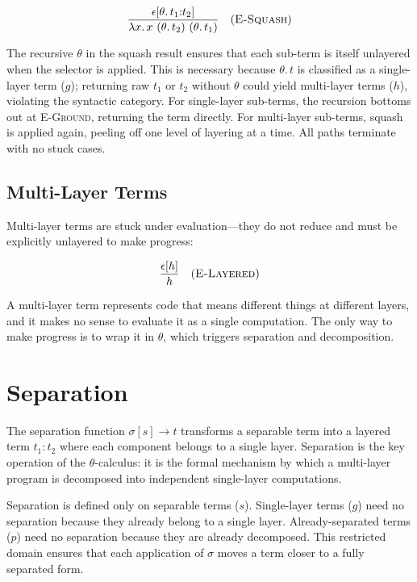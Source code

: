 \documentclass[11pt,letterpaper]{article}
\theoremstyle{definition}
\begin{document}
$$
\dfrac{\epsilon[\theta.\,t_1{:}t_2]}{\lambda x.\, x\ (\theta.\,t_2)\ (\theta.\,t_1)}
\quad (\textsc{E-Squash})
$$

The recursive $\theta$ in the squash result ensures that each sub-term is
itself unlayered when the selector is applied. This is necessary because
$\theta.\,t$ is classified as a single-layer term ($g$); returning raw $t_1$
or $t_2$ without $\theta$ could yield multi-layer terms ($h$), violating the
syntactic category. For single-layer sub-terms, the recursion bottoms out at
\textsc{E-Ground}, returning the term directly. For multi-layer sub-terms,
squash is applied again, peeling off one level of layering at a time. All
paths terminate with no stuck cases.

\subsection{Multi-Layer Terms}

Multi-layer terms are stuck under evaluation---they do not reduce and must be
explicitly unlayered to make progress:

$$
\dfrac{\epsilon[h]}{h}
\quad (\textsc{E-Layered})
$$

A multi-layer term represents code that means different things at different
layers, and it makes no sense to evaluate it as a single computation. The only
way to make progress is to wrap it in $\theta$, which triggers separation and
decomposition.


\section{Separation}\label{sec:separation}

The separation function $\sigma[s] \to t$ transforms a separable term into a
layered term $t_1{:}t_2$ where each component belongs to a single layer.
Separation is the key operation of the $\theta$-calculus: it is the formal
mechanism by which a multi-layer program is decomposed into independent
single-layer computations.

Separation is defined only on separable terms ($s$). Single-layer terms ($g$)
need no separation because they already belong to a single layer.
Already-separated terms ($p$) need no separation because they are already
decomposed. This restricted domain ensures that each application of $\sigma$
moves a term closer to a fully separated form.
\end{document}
